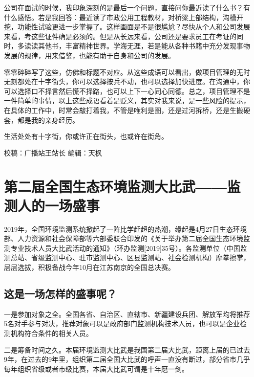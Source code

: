 \documentclass[
]{book}
\begin{document}
公司在面试的时候，我印象深刻的是最后一个问题，直接问你最近读了什么书？有什么感悟。若是我回答：最近读了市政公用工程教材，对桥梁上部结构，沟槽开挖，功能性试验更进一步掌握了。这样画面是不是很尴尬？尽快从个人和公司发展来看，考这些证件确是必须的。但是从长远来看，公司还是要求员工在考证的同时，多读读其他书，丰富精神世界。学海无涯，若是能从各种书籍中充分发现事物发展的规律，用来借鉴，也能有助于自身和公司的发展。

零零碎碎写了这些，仿佛和标题不对应。从这些成语可以看出，做项目管理的无时无刻都处在十字街头，你可以选择按兵不动，也可以选择加快进度。在沟通中，你可以选择口不择言然后慌不择路，也可以上下一心同心同德。总之，项目管理不是一件简单的事情，以上这些成语看着是贬义，其实对我来说，是一些风险的提示，在具体的工作中，时常会敲打着我，不管是唯利是图，还是过河拆桥，还是生搬硬套，都是我的亲身经历。

生活处处有十字街，你或许正在街头，也或许在街角。

校稿：广播站王站长
编辑：天枫

\hypertarget{ux7b2cux4e8cux5c4aux5168ux56fdux751fux6001ux73afux5883ux76d1ux6d4bux5927ux6bd4ux6b66ux76d1ux6d4bux4ebaux7684ux4e00ux573aux76dbux4e8b}{%
\section{第二届全国生态环境监测大比武------监测人的一场盛事}\label{ux7b2cux4e8cux5c4aux5168ux56fdux751fux6001ux73afux5883ux76d1ux6d4bux5927ux6bd4ux6b66ux76d1ux6d4bux4ebaux7684ux4e00ux573aux76dbux4e8b}}

2019年，全国环境监测系统掀起了一阵比学赶超的热潮，缘起是4月27日生态环境部、人力资源和社会保障部等六部委联合印发的《关于举办第二届全国生态环境监测专业技术人员大比武活动的通知》（环办监测{[}2019{]}35号）。各监测单位（中国监测总站、省级监测中心、驻市监测中心、区县监测站、社会检测机构）摩拳擦掌，层层选拔，积极备战今年10月在江苏南京的全国总决赛。

\hypertarget{ux8fd9ux662fux4e00ux573aux600eux6837ux7684ux76dbux4e8bux5462}{%
\subsection{这是一场怎样的盛事呢？}\label{ux8fd9ux662fux4e00ux573aux600eux6837ux7684ux76dbux4e8bux5462}}

一是参加对象之全。全国各省、自治区、直辖市、新疆建设兵团、解放军均将推荐5名对手参与对决，推荐对象可以是政府部门监测机构技术人员，也可以是企业检测机构符合条件的相关人员。

二是筹备时间之久。本届环境监测大比武是我国第二届大比武，距离上届的已过去9年，在过去的9年里，组织第二届全国大比武的呼声一直没有断过，部分省市几乎每年组织省级或者市级比赛，本届大比武可谓是十年磨一剑。
\end{document}
